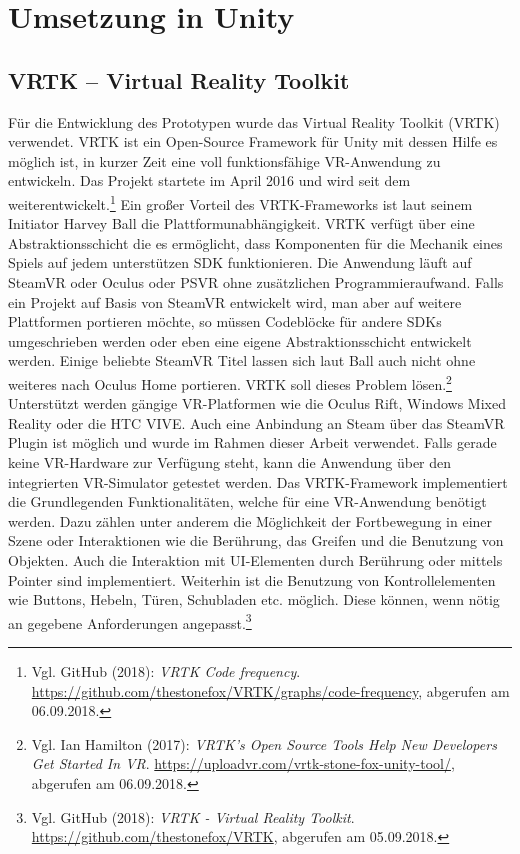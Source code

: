 \chapter{Umsetzung in Unity}

\section{VRTK -- Virtual Reality Toolkit}
\label{sec:VRTK-VirtualRealityToolkit}

Für die Entwicklung des Prototypen wurde das  Virtual Reality Toolkit (VRTK) verwendet. VRTK ist ein Open-Source Framework für Unity mit dessen Hilfe es möglich ist, in kurzer Zeit eine voll funktionsfähige VR-Anwendung zu entwickeln. Das Projekt startete im April 2016 und wird seit dem weiterentwickelt.\footnote{Vgl. GitHub (2018): \textit{VRTK Code frequency}.\newline
\url{https://github.com/thestonefox/VRTK/graphs/code-frequency},\newline 
abgerufen am 06.09.2018.} 
Ein großer Vorteil des VRTK-Frameworks ist laut seinem Initiator Harvey Ball die Plattformunabhängigkeit. VRTK verfügt über eine Abstraktionsschicht die es ermöglicht, dass Komponenten für die Mechanik eines Spiels auf jedem unterstützen SDK funktionieren. Die Anwendung läuft auf SteamVR oder Oculus oder PSVR ohne zusätzlichen Programmieraufwand. Falls ein Projekt auf Basis von SteamVR entwickelt wird, man aber auf weitere Plattformen portieren möchte, so müssen Codeblöcke für andere SDKs umgeschrieben werden oder eben eine eigene Abstraktionsschicht entwickelt werden. Einige beliebte SteamVR Titel lassen sich laut Ball auch nicht ohne weiteres nach Oculus Home portieren. VRTK soll dieses Problem lösen.\footnote{Vgl. Ian Hamilton (2017): \textit{VRTK’s Open Source Tools Help New Developers Get Started In VR}.\newline
\url{https://uploadvr.com/vrtk-stone-fox-unity-tool/},\newline 
abgerufen am 06.09.2018.}
Unterstützt werden gängige VR-Platformen wie die Oculus Rift, Windows Mixed Reality oder die HTC VIVE. Auch eine Anbindung an Steam über das SteamVR Plugin ist möglich und wurde im Rahmen dieser Arbeit verwendet. Falls gerade keine VR-Hardware zur Verfügung steht, kann die Anwendung über den integrierten VR-Simulator getestet werden. 
Das VRTK-Framework implementiert die Grundlegenden Funktionalitäten, welche für eine VR-Anwendung benötigt werden. Dazu zählen unter anderem die Möglichkeit der Fortbewegung in einer Szene oder Interaktionen wie die Berührung, das Greifen und die Benutzung von Objekten.  Auch die Interaktion mit UI-Elementen durch Berührung oder mittels Pointer sind implementiert. Weiterhin ist die Benutzung von Kontrollelementen wie Buttons, Hebeln, Türen, Schubladen etc. möglich. Diese können, wenn nötig an gegebene Anforderungen angepasst.\footnote{Vgl. GitHub (2018): \textit{VRTK - Virtual Reality Toolkit}.\newline
\url{https://github.com/thestonefox/VRTK},\newline 
abgerufen am 05.09.2018.}

